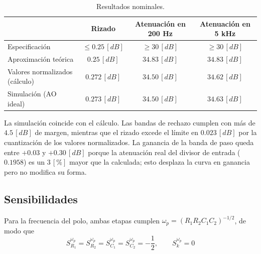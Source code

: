 \begin{table}[H]
    \centering
    \caption{Resultados nominales.}
    \label{tab:nominal}
    \begin{tabular}{|l|c|c|c|}
        \hline
        & \textbf{Rizado} & \textbf{Atenuación en 200 Hz} & \textbf{Atenuación en 5 kHz} \\
        \hline
        Especificación & $\leq 0.25 \, [dB]$ & $\geq 30 \, [dB]$ & $\geq 30 \, [dB]$ \\
        Aproximación teórica & $0.25 \, [dB]$ & $34.83 \, [dB]$ & $34.83 \, [dB]$ \\
        Valores normalizados (cálculo) & $0.272 \, [dB]$ & $34.50 \, [dB]$ & $34.62 \, [dB]$ \\
        Simulación (AO ideal) & $0.273 \, [dB]$ & $34.50 \, [dB]$ & $34.63 \, [dB]$ \\
        \hline
    \end{tabular}
\end{table}

La simulación coincide con el cálculo. Las bandas de rechazo cumplen con más de $4.5 \, [dB]$ de margen, mientras que el rizado excede el límite en $0.023 \, [dB]$ por la cuantización de los valores normalizados. La ganancia de la banda de paso queda entre $+0.03$ y $+0.30 \, [dB]$ porque la atenuación real del divisor de entrada ($0.1958$) es un $3 \, [\%]$ mayor que la calculada; esto desplaza la curva en ganancia pero no modifica su forma.

\subsection{Sensibilidades}
\label{sec_3.4}
Para la frecuencia del polo, ambas etapas cumplen $\omega_p = (R_1 R_2 C_1 C_2)^{-1/2}$, de modo que
\begin{equation}
    S_{R_1}^{\omega_p} = S_{R_2}^{\omega_p} = S_{C_1}^{\omega_p} = S_{C_2}^{\omega_p} = -\frac{1}{2}, \qquad S_k^{\omega_p} = 0
\end{equation}

